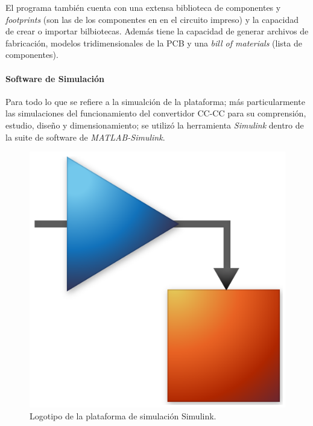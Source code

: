 El programa también cuenta con una extensa biblioteca de componentes y \textit{footprints} (son las  de los componentes en en el circuito impreso) y la capacidad de crear o importar bilbiotecas. Además tiene la capacidad de generar archivos de fabricación, modelos tridimensionales de la PCB y una \textit{bill of materials} (lista de componentes).\\

\paragraph{Software de Simulación}

Para todo lo que se refiere a la simualción de la plataforma; más particularmente las simulaciones del funcionamiento del convertidor CC-CC para su comprensión, estudio, diseño y dimensionamiento; se utilizó la herramienta {\Medium\textit{Simulink}} dentro de la suite de software de \textit{MATLAB-Simulink}.\\

\begin{figure}[h]
    \centering
    \includegraphics[scale=0.06]{Imagenes/Simulink.png}
    \caption{Logotipo de la plataforma de simulación Simulink.}
    \label{logo_simulink}
\end{figure}

